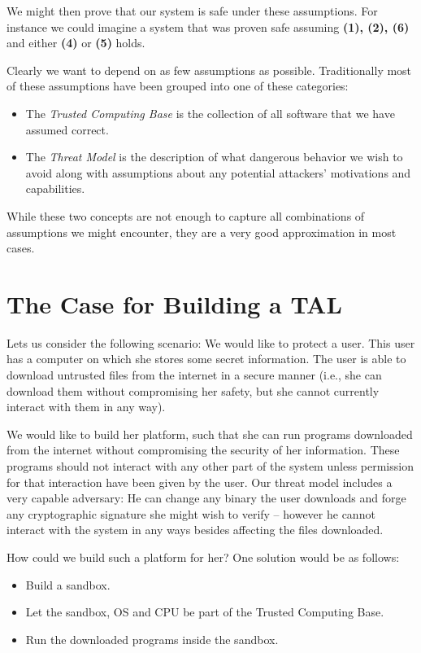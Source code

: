 We might then prove that our system is safe under these assumptions. For
instance we could imagine a system that was proven safe assuming \textbf{(1),
  (2), (6)} and either \textbf{(4)} or \textbf{(5)} holds.

Clearly we want to depend on as few assumptions as possible. Traditionally most
of these assumptions have been grouped into one of these categories:

\begin{itemize}
\item The \emph{Trusted Computing Base} is the collection of all software that
  we have assumed correct.
\item The \emph{Threat Model} is the description of what dangerous behavior we
  wish to avoid along with assumptions about any potential attackers'
  motivations and capabilities.
\end{itemize}

While these two concepts are not enough to capture all combinations of
assumptions we might encounter, they are a very good approximation in most
cases.

\section{The Case for Building a TAL}
Lets us consider the following scenario: We would like to protect a user. This
user has a computer on which she stores some secret information. The user is
able to download untrusted files from the internet in a secure manner (i.e., she
can download them without compromising her safety, but she cannot currently
interact with them in any way).

We would like to build her platform, such that she can run programs downloaded
from the internet without compromising the security of her information. These
programs should not interact with any other part of the system unless permission
for that interaction have been given by the user. Our threat model includes a
very capable adversary: He can change any binary the user downloads and forge
any cryptographic signature she might wish to verify -- however he cannot
interact with the system in any ways besides affecting the files downloaded.

How could we build such a platform for her? One solution would be as follows:

\begin{itemize}
\item Build a sandbox.
\item Let the sandbox, OS and CPU be part of the Trusted Computing Base.
\item Run the downloaded programs inside the sandbox.
\end{itemize}

